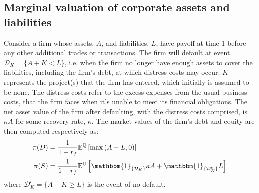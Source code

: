 \documentclass[../main.tex]{subfiles}
\begin{document}
    \subsection{Marginal valuation of corporate assets and liabilities}
        Consider a firm whose assets, $A$, and liabilities, $L$, have payoff at time 1 before any other additional trades or transactions.        
        The firm will default at event $\mathcal{D}_K=\{A + K<L\}$, i.e. when the firm no longer have enough assets to cover the liabilities, including the firm's debt, at which distress costs may occur.
        $K$ represents the project(s) that the firm has entered, which initially is assumed to be none.
        The distress costs refer to the excess expenses from the usual business costs, that the firm faces when it's unable to meet its financial obligations.
        The net asset value of the firm after defaulting, with the distress costs comprised, is $\kappa A$ for some recovery rate, $\kappa$.
        The market values of the firm's debt and equity are then computed respectively as:
        \begin{align}
            \pi(D) &= \discountfactor \mathbb{E}^{\mathbb{Q}}\left[\max\left(A-L,0\right)\right]\\
            \pi(S) &= \discountfactor \mathbb{E}^{\mathbb{Q}}\left[\mathbbm{1}_{\{\mathcal{D}_{K}\}}\kappa A + \mathbbm{1}_{\{\mathcal{D}_{K}^c\}}L\right]
        \end{align}
        where $\mathcal{D}_{K}^c = \{A + K \geq L\}$ is the event of no default.
        
\end{document}
